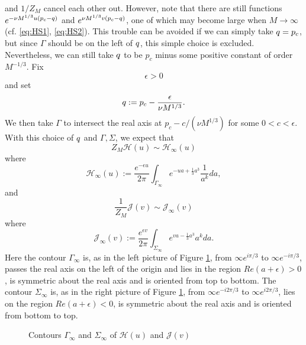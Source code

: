\documentclass[11pt]{article}
\begin{document}
and $1/Z_M$ cancel each other out. However, note that there are
still functions $e^{-\nu M^{1/3} u(p_c-q)}$ and $e^{\nu M^{1/3}
v(p_c-q)}$, one of which may become large when $M\to\infty$ (cf.
\eqref{eq:HS1}, \eqref{eq:HS2}). This trouble can be avoided if we
can simply take $q=p_c$, but since $\Gamma$ should be on the
left of $q$, this simple choice is excluded. Nevertheless, we
can still take $q$ to be $p_c$ minus some positive constant of
order $M^{-1/3}$. Fix
\begin{equation}
 \epsilon>0
\end{equation}
and set
\begin{equation}\label{eq:c1}
  q :=p_c - \frac{\epsilon}{\nu M^{1/3}}.
\end{equation}
We then take $\Gamma$ to intersect the real axis at $p_c - c/(\nu
M^{1/3})$ for some $0<c<\epsilon$. With this choice of $q$ and
$\Gamma, \Sigma$, we expect that
\begin{equation}
  Z_M \mathcal{H}(u) \sim
  \mathcal{H}_\infty(u)
\end{equation}
where
\begin{equation}\label{eq:Hinf1}
  \mathcal{H}_\infty(u) := \frac{e^{-\epsilon u}}{2\pi}
\int_{\Gamma_{\infty}}  e^{-ua+\frac13a^3}
  \frac1{a^k} da,
\end{equation}
and
\begin{equation}
   \frac1{Z_M} \mathcal{J}(v) \sim \mathcal{J}_\infty(v)
\end{equation}
where
\begin{equation}\label{eq:Jinf1}
  \mathcal{J}_\infty(v) := \frac{e^{\epsilon v}}{2\pi}  \int_{\Sigma_\infty}
e^{va-\frac13a^3}
  a^k da.
\end{equation}
Here the contour $\Gamma_\infty$ is, as in the left picture of
Figure \ref{fig:HJcon}, from $\infty e^{i\pi/3}$ to $\infty
e^{-i\pi/3}$, passes the real axis on the left of the origin and
lies in the region $Re(a+\epsilon)>0$, is symmetric about the real
axis and is oriented from top to bottom. The contour
$\Sigma_\infty$ is, as in the right picture of Figure
\ref{fig:HJcon}, from $\infty e^{-i2\pi/3}$ to $\infty
e^{i2\pi/3}$, lies on the region $Re(a+\epsilon)<0$, is symmetric
about the real axis and is oriented from bottom to top.




\begin{figure}[ht]
\centerline{\epsfxsize=17cm}
\caption{Contours $\Gamma_\infty$ and $\Sigma_\infty$
of $\mathcal{H}(u)$ and $\mathcal{J}(v)$}\label{fig:HJcon}
\end{figure}
\end{document}
